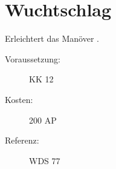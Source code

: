 \section{Wuchtschlag}
\label{sf.wuchtschlag}
Erleichtert das Manöver .
\begin{description}
    \item[Voraussetzung:]
        KK 12
    \item [Kosten:]
        200 AP
    \item [Referenz:]
        WDS 77
\end{description}
